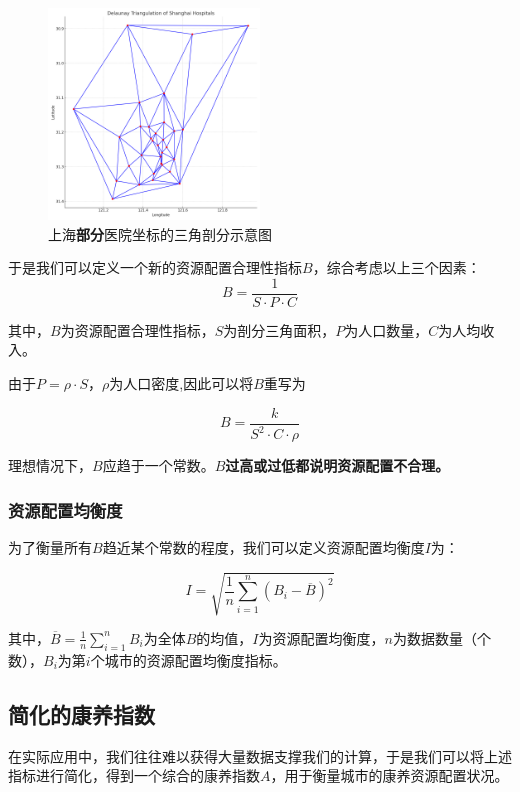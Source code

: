 \documentclass[12pt,a4paper]{article}
\begin{document}
\begin{figure}[H] %
\centering %
\includegraphics[width=0.5\textwidth]{images/delaunay_triangulation_shanghai.png} %
\caption{上海\textbf{部分}医院坐标的三角剖分示意图} %
\label{Fig.main2} %
\end{figure}

于是我们可以定义一个新的资源配置合理性指标$B$，综合考虑以上三个因素：
\[
B = \frac{1}{S\cdot P \cdot C}
\]

其中，$B$为资源配置合理性指标，$S$为剖分三角面积，$P$为人口数量，$C$为人均收入。

由于$P=\rho \cdot S$，$\rho$为人口密度,因此可以将$B$重写为

\[
B = \frac{k}{S^2 \cdot C \cdot \rho}
\]

理想情况下，$B$应趋于一个常数。\textbf{$B$过高或过低都说明资源配置不合理。}

\subsubsection{资源配置均衡度}

为了衡量所有$B$趋近某个常数的程度，我们可以定义资源配置均衡度$I$为：

\[
I = \sqrt{\frac{1}{n} \sum_{i=1}^{n}(B_i - \overline{B})^2}
\]

其中，$\overline{B} = \frac{1}{n} \sum_{i=1}^{n}B_i$为全体$B$的均值，$I$为资源配置均衡度，$n$为数据数量（个数），$B_i$为第$i$个城市的资源配置均衡度指标。

\subsection{简化的康养指数}

在实际应用中，我们往往难以获得大量数据支撑我们的计算，于是我们可以将上述指标进行简化，得到一个综合的康养指数$A$，用于衡量城市的康养资源配置状况。
\end{document}
